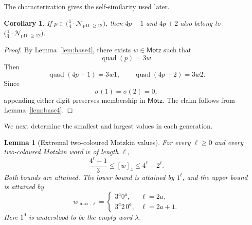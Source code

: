 \documentclass[12pt]{article}
\theoremstyle{plain}
\newtheorem{lemma}[theorem]{Lemma}
\newtheorem{corollary}[theorem]{Corollary}
\theoremstyle{definition}
\theoremstyle{plain}
\newcommand{\Pset}{%
  \bigl(\tfrac{1}{4}\cdot\mathcal{N}_{\mathrm{pD},\geq 12}\bigr)%
}
\begin{document}
The characterization gives the self-similarity used later.

\begin{corollary}\label{cor:Pclosure}
If $p\in\Pset$, then $4p+1$ and $4p+2$ also belong to $\Pset$.
\end{corollary}

\begin{proof}
By Lemma~\ref{lem:base4}, there exists $w\in\mathsf{Motz}$ such that
\[
 \operatorname{quad}(p)=3w.
\]
Then
\[
 \operatorname{quad}(4p+1)=3w1,
 \qquad
 \operatorname{quad}(4p+2)=3w2.
\]
Since
\[
 \sigma(1)=\sigma(2)=0,
\]
appending either digit preserves membership in $\mathsf{Motz}$.  The claim follows from
Lemma~\ref{lem:base4}.
\end{proof}

We next determine the smallest and largest values in each generation.

\begin{lemma}[Extremal two-coloured Motzkin values]\label{lem:extremal}
For every $\ell\geq0$ and every two-coloured Motzkin word $w$ of length $\ell$,
\begin{equation}\label{eq:motzkin-extrema}
  \frac{4^{\ell}-1}{3}\leq[w]_4\leq4^{\ell}-2^{\ell}.
\end{equation}
Both bounds are attained.  The lower bound is attained by $1^{\ell}$, and the
upper bound is attained by
\[
  w_{\max,\ell}=
  \begin{cases}
    3^a0^a,&\ell=2a,\\
    3^a2\,0^a,&\ell=2a+1.
  \end{cases}
\]
Here $1^0$ is understood to be the empty word $\lambda$.
\end{lemma}
\end{document}
